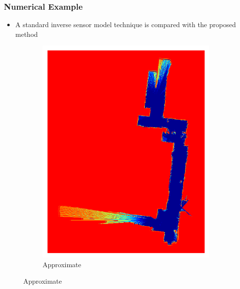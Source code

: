 \documentclass[11pt,professionalfonts,hyperref={pdftex,pdfpagemode=none,pdfstartview=FitH}]{beamer}
\renewcommand{\emph}[1]{\textit{\textbf{\color{blue}{#1}}}}
\begin{document}
\begin{frame}
\frametitle{Numerical Example}

\begin{minipage}[t]{5.0cm}
\vspace*{0.5cm}
\begin{itemize}
	\item A standard \emph{approximate} inverse sensor model technique is compared with the proposed \emph{exact} method
\end{itemize}
\end{minipage}
\begin{minipage}[t]{5.0cm}
\begin{figure}[!htbp]
    \centering
    \begin{subfigure}{0.5\textwidth}
        \centering
        \includegraphics[width=\textwidth]{AISM_Image_inf_19.pdf}
        \caption*{Approximate}
    \end{subfigure}
    \hspace*{-0.1\textwidth}

\end{figure}
\end{minipage}
\end{frame}
\end{document}
